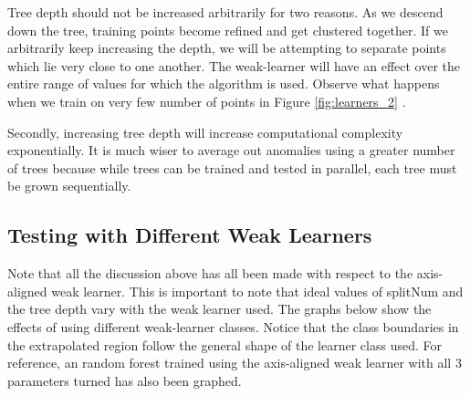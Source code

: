 \documentclass[a4paper,pra,twocolumn,10pt,aps,longbibliography,nobalancelastpage]{revtex4-1}
\begin{document}
Tree depth should not be increased arbitrarily for two reasons. As we descend down the tree, training points become refined and get clustered together. If we arbitrarily keep increasing the depth, we will be attempting to separate points which lie very close to one another. The weak-learner will have an effect over the entire range of values for which the algorithm is used. Observe what happens when we train on very few number of points in Figure \ref{fig:learners_2} .

Secondly, increasing tree depth will increase computational complexity exponentially. It is much wiser to average out anomalies using a greater number of trees because while trees can be trained and tested in parallel, each tree must be grown sequentially.


\subsection{Testing with Different Weak Learners}

Note that all the discussion above has all been made with respect to the axis-aligned weak learner. This is important to note that ideal values of splitNum and the tree depth vary with the weak learner used. The graphs below show the effects of using different weak-learner classes. Notice that the class boundaries in the extrapolated region follow the general shape of the learner class used. For reference, an random forest trained using the axis-aligned weak learner with all 3 parameters turned has also been graphed.
\end{document}

